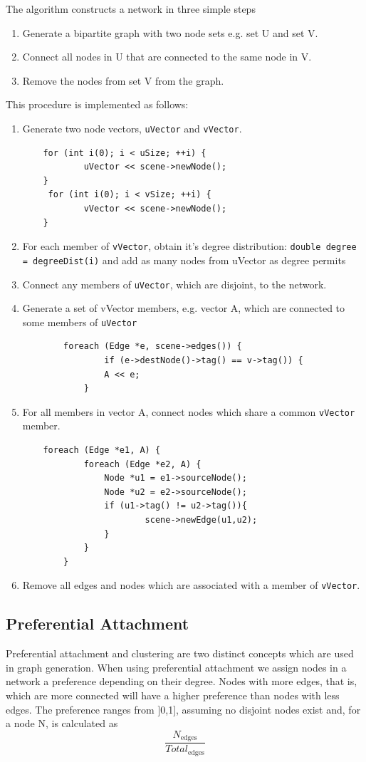 \documentclass[a4paper,11pt,titlepage]{article}
\newcommand{\code}[1]{\texttt{#1}}
\begin{document}
The algorithm constructs a network in three simple steps
\begin{enumerate}
   \item Generate a bipartite graph with two node sets e.g. set U and set V.
   \item Connect all nodes in U that are connected to the same node in V.
   \item Remove the nodes from set V from the graph.
\end{enumerate}

This procedure is implemented as follows:
\begin{enumerate}
   \item Generate two node vectors, \code{uVector} and \code{vVector}.
\begin{lstlisting}
	for (int i(0); i < uSize; ++i) {
        	uVector << scene->newNode();
	}
	 for (int i(0); i < vSize; ++i) {
        	vVector << scene->newNode();
	}
\end{lstlisting}
   \item For each member of \code{vVector}, obtain it's degree distribution:
\code{double degree = degreeDist(i)} and add as many nodes from uVector as degree permits
   \item Connect any members of \code{uVector}, which are disjoint, to the network.
   \item Generate a set of vVector members, e.g. vector A, which are connected to some members of \code{uVector}
\begin{lstlisting}
       	foreach (Edge *e, scene->edges()) {
            	if (e->destNode()->tag() == v->tag()) {
                A << e;
            }
\end{lstlisting}
   \item For all members in vector A, connect nodes which share a common \code{vVector} member.
\begin{lstlisting}
	foreach (Edge *e1, A) {
            foreach (Edge *e2, A) {
                Node *u1 = e1->sourceNode();
                Node *u2 = e2->sourceNode();
                if (u1->tag() != u2->tag()){
                        scene->newEdge(u1,u2);
                }
            }
        }
\end{lstlisting}
   \item Remove all edges and nodes which are associated with a member of \code{vVector}.
\end{enumerate}

\subsection{Preferential Attachment}
Preferential attachment and clustering are two distinct concepts which are used in graph generation.
When using preferential attachment we assign nodes in a network a preference depending on their degree. Nodes with more edges, that is, which are more connected will have a higher preference than nodes with less edges. The preference ranges from ]0,1], assuming no disjoint nodes exist and, for a node N, is calculated as 
\[
\frac{N_\mathrm{edges}}{Total_\mathrm{edges}}
\]
\end{document}

